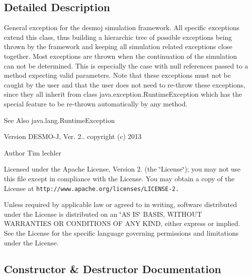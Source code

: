 \subsection{Detailed Description}
General exception for the desmoj simulation framework. All specific exceptions extend this class, thus building a hierarchic tree of possible exceptions being thrown by the framework and keeping all simulation related exceptions close together. Most exceptions are thrown when the continuation of the simulation can not be determined. This is especially the case with {\ttfamily null} references passed to a method expecting valid parameters. Note that these exceptions must not be caught by the user and that the user does not need to re-\/throw these exceptions, since they all inherit from class {\ttfamily java.\-exception.\-Runtime\-Exception} which has the special feature to be re-\/thrown automatically by any method.

\begin{DoxySeeAlso}{See Also}
java.\-lang.\-Runtime\-Exception
\end{DoxySeeAlso}
\begin{DoxyVersion}{Version}
D\-E\-S\-M\-O-\/\-J, Ver. 2.. copyright (c) 2013 
\end{DoxyVersion}
\begin{DoxyAuthor}{Author}
Tim lechler
\end{DoxyAuthor}
Licensed under the Apache License, Version 2. (the \char`\"{}\-License\char`\"{}); you may not use this file except in compliance with the License. You may obtain a copy of the License at {\tt http\-://www.\-apache.\-org/licenses/\-L\-I\-C\-E\-N\-S\-E-\/2.}

Unless required by applicable law or agreed to in writing, software distributed under the License is distributed on an \char`\"{}\-A\-S I\-S\char`\"{} B\-A\-S\-I\-S, W\-I\-T\-H\-O\-U\-T W\-A\-R\-R\-A\-N\-T\-I\-E\-S O\-R C\-O\-N\-D\-I\-T\-I\-O\-N\-S O\-F A\-N\-Y K\-I\-N\-D, either express or implied. See the License for the specific language governing permissions and limitations under the License. 

\subsection{Constructor \& Destructor Documentation}
